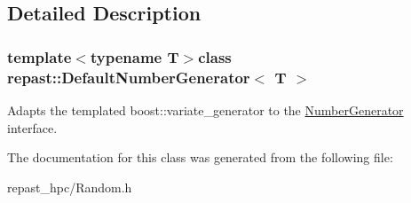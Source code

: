 \subsection{Detailed Description}
\subsubsection*{template$<$typename T$>$class repast\-::\-Default\-Number\-Generator$<$ T $>$}

Adapts the templated boost\-::variate\-\_\-generator to the \hyperlink{classrepast_1_1_number_generator}{Number\-Generator} interface. 

The documentation for this class was generated from the following file\-:\begin{DoxyCompactItemize}
\item 
repast\-\_\-hpc/Random.\-h\end{DoxyCompactItemize}
